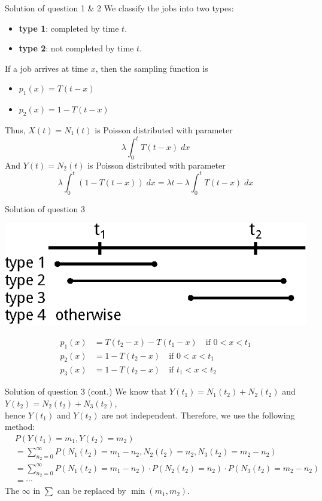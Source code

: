 \documentclass[mathserif]{beamer}
\begin{document}
\begin{frame}{Solution of question 1 \& 2}
We classify the jobs into two types:
\begin{itemize}
\item \textbf{type 1}: completed by time $t$.
\item \textbf{type 2}: not completed by time $t$.
\end{itemize}
If a job arrives at time $x$, then the sampling function is
\begin{itemize}
\item $p_1(x) = T(t-x)$
\item $p_2(x) = 1 - T(t-x)$
\end{itemize}
Thus, $X(t) = N_1(t)$ is Poisson distributed with parameter
\[
\lambda\int_0^t T(t-x)\;dx
\]
And $Y(t) = N_2(t)$ is Poisson distributed with parameter
\[
\lambda\int_0^t (1-T(t-x))\;dx = \lambda t - \lambda\int_0^t T(t-x)\;dx
\]
\end{frame}

\begin{frame}{Solution of question 3}
\begin{center}
\includegraphics[scale=1.0]{infinite_server}
\end{center}
\begin{align*}
p_1(x) & = T(t_2-x) - T(t_1-x) \quad\text{if } 0 < x < t_1 \\
p_2(x) & = 1 - T(t_2-x) \quad\text{if } 0 < x < t_1 \\
p_3(x) & = 1 - T(t_2-x) \quad\text{if } t_1 < x < t_2
\end{align*}
\end{frame}

\begin{frame}{Solution of question 3 (cont.)}
We know that $Y(t_1) = N_1(t_2) + N_2(t_2)$ and $Y(t_2) = N_2(t_2) + N_3(t_2)$, \\
hence $Y(t_1)$ and $Y(t_2)$ are not independent.
Therefore, we use the following method:
\begin{align*}
& P(Y(t_1) = m_1, Y(t_2) = m_2) \\
& = \sum_{n_2 = 0}^\infty P(N_1(t_2) = m_1-n_2, N_2(t_2) = n_2, N_3(t_2) = m_2-n_2) \\
& = \sum_{n_2 = 0}^\infty P(N_1(t_2) = m_1-n_2)\cdot P(N_2(t_2) = n_2)\cdot P(N_3(t_2) = m_2-n_2) \\
& = \cdots
\end{align*}
The $\infty$ in $\sum$ can be replaced by $\min(m_1, m_2)$.
\end{frame}
\end{document}
